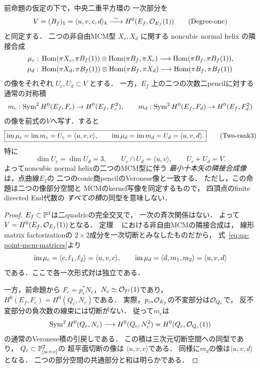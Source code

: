 \begin{proposition}[MCMの隣接積と二pencilのVeronese積の一致]
\label{prop:qa-point-mcm-composition-veronese}
前命題の仮定の下で，中央二重平方環の
一次部分を
\[
 V=(B_f)_1=\langle u,v,c,d\rangle_k
     \xrightarrow{\ \sim\ }
     H^0(E_f,\mathcal O_{E_f}(1))
 \tag{Degree-one}\label{eq:qa-point-degree-one-restriction}
\]
と同定する．
二つの非自由MCM型 $X_c,X_d$ に関する
noncubic normal helix の隣接合成
\[
 \begin{aligned}
 \mu_c:\;&
 \operatorname{Hom}(\pi X_c,\pi B_f(1))
 \otimes\operatorname{Hom}(\pi B_f,\pi X_c)
 \longrightarrow\operatorname{Hom}(\pi B_f,\pi B_f(1)),\\
 \mu_d:\;&
 \operatorname{Hom}(\pi X_d,\pi B_f(1))
 \otimes\operatorname{Hom}(\pi B_f,\pi X_d)
 \longrightarrow\operatorname{Hom}(\pi B_f,\pi B_f(1))
 \end{aligned}
\]
の像をそれぞれ $U_c,U_d\subset V$ とする．
一方，$E_f$ 上の二つの次数二pencilに対する
通常の対称積
\[
 m_c:\operatorname{Sym}^2H^0(E_f,F_c)\to H^0(E_f,F_c^2),
 \qquad
 m_d:\operatorname{Sym}^2H^0(E_f,F_d)\to H^0(E_f,F_d^2)
\]
の像を前式の$V$へ写す．すると
\[
 \boxed{
 \operatorname{im}\mu_c=\operatorname{im} m_c=U_c=\langle u,v,c\rangle,\qquad
 \operatorname{im}\mu_d=\operatorname{im} m_d=U_d=\langle u,v,d\rangle.}
 \tag{Two-rank3}\label{eq:qa-point-two-rank-three-subspaces}
\]
特に
\[
 \dim U_c=\dim U_d=3,\qquad
 U_c\cap U_d=\langle u,v\rangle,\qquad U_c+U_d=V.
\]
よってnoncubic normal helixの二つのMCM型に伴う
\emph{最小十本矢の隣接合成像}は，点曲線$E_f$の
二つのconic商pencilのVeronese像と一致する．
ただし，この命題は二つの像部分空間と
MCMのkernel写像を同定するもので，
四頂点のfinite directed End代数の
\emph{すべての積}の同型を意味しない．
\end{proposition}
\begin{proof}
$E_f\subset\mathbb P^3$は二quadricの完全交叉で，
一次の斉次関係はない．
よって$V=H^0(E_f,\mathcal O_{E_f}(1))$となる．
定理
~\cite[\texttt{thm:normal-helix} および
 \texttt{cor:normal-cubic-defect}]{QuadricIntrinsic2026}
における非自由MCMの隣接合成は，
線形matrix factorizationの
$2\times2$成分を一次切断とみなしたものだから，
式~\eqref{eq:qa-point-mcm-matrices}より
\[
 \operatorname{im}\mu_c=\langle c,\ell_1,\ell_2\rangle
          =\langle u,v,c\rangle,\qquad
 \operatorname{im}\mu_d=\langle d,m_1,m_2\rangle
          =\langle u,v,d\rangle
\]
である．ここで各一次形式対は独立である．

一方，前命題から
$F_c=p_c^*N_c$，$N_c\simeq\mathcal O_{\mathbb P^1}(1)$であり，
$H^0(E_f,F_c)=H^0(Q_c,N_c)$である．
実際，$p_{c*}\mathcal O_{E_f}$の不変部分は$\mathcal O_{Q_c}$で，
反不変部分の負次数の線束には切断がない．
従って$m_c$は
\[
 \operatorname{Sym}^2H^0(Q_c,N_c)\longrightarrow
 H^0(Q_c,N_c^2)=H^0(Q_c,\mathcal O_{Q_c}(1))
\]
の通常のVeronese積の引戻しである．
この積は三次元切断空間への同型であり，
$Q_c\subset\mathbb P^2_{[u:v:c]}$の
超平面切断の像は
$\langle u,v,c\rangle$である．
同様に$m_d$の像は$\langle u,v,d\rangle$となる．
二つの部分空間の共通部分と和は明らかである．
\end{proof}

